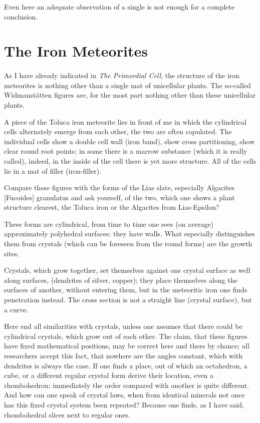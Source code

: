 \documentclass[a4paper, 11pt, oneside]{article}
\begin{document}
Even here an adequate observation of a single is not enough for a complete conclusion.
\clearpage
\section{The Iron Meteorites}
\paragraph{}
As I have already indicated in \emph{The Primordial Cell}, the structure of the iron meteorites is nothing other than a single mat of unicellular plants. The so-called Widmanstätten figures are, for the most part nothing other than these unicellular plants.

A piece of the Toluca iron meteorite lies in front of me in which the cylindrical cells alternately emerge from each other, the two are often copulated. The individual cells show a double cell wall (iron band), show cross partitioning, show clear round root points; in some there is a marrow substance (which it is really called), indeed, in the inside of the cell there is yet more structure. All of the cells lie in a mat of filler (iron-filler).

Compare these figures with the forms of the Lias slate, especially Algacites [Fucoides] granulatus and ask yourself, of the two, which one shows a plant structure clearest, the Toluca iron or the Algacites from Lias-Epsilon?

These forms are cylindrical, from time to time one sees (on average) approximately polyhedral surfaces: they have walls. What especially distinguishes them from crystals (which can be foreseen from the round forms) are the growth sites.

Crystals, which grow together, set themselves against one crystal surface as well along surfaces, (dendrites of silver, copper); they place themselves along the surfaces of another, without entering them, but in the meteoritic iron one finds penetration instead. The cross section is not a straight line (crystal surface), but a curve.

Here end all similarities with crystals, unless one assumes that there could be cylindrical crystals, which grow out of each other. The claim, that these figures have fixed mathematical positions, may be correct here and there by chance; all researchers accept this fact, that nowhere are the angles constant, which with dendrites is always the case. If one finds a place, out of which an octahedron, a cube, or a different regular crystal form derive their location, even a rhombohedron: immediately the order compared with another is quite different. And how can one speak of crystal laws, when from identical minerals not once has this fixed crystal system been repeated? Because one finds, as I have said, rhombohedral slices next to regular ones.
\end{document}
